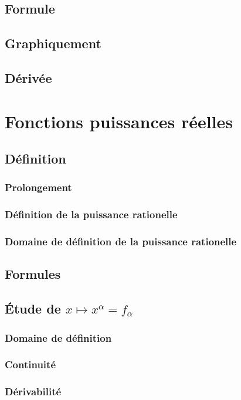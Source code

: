 \documentclass[12pt,a4paper,french]{book}
\begin{document}
		\subsection{Formule}
		\subsection{Graphiquement}
		\subsection{Dérivée}
	\section{Fonctions puissances réelles}
		\subsection{Définition}
			\subsubsection{Prolongement}
			\subsubsection{Définition de la puissance rationelle}
			
			\subsubsection{Domaine de définition de la puissance rationelle}
			
		\subsection{Formules}
		
		\subsection{Étude de $x\mapsto x^{\alpha} = f_{\alpha}$}
			\subsubsection{Domaine de définition}
			\subsubsection{Continuité}
			\subsubsection{Dérivabilité}
\end{document}
